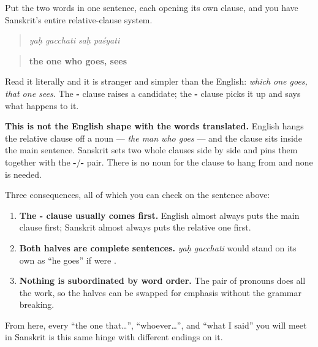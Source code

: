 \begin{grammarlens}[title={Grammar Lens: two clauses, one hinge}]
Put the two words in one sentence, each opening its own clause, and you have Sanskrit's entire relative-clause system.

\begin{quote}
\textbf{   }
\end{quote}

\begin{quote}
\emph{yaḥ gacchati saḥ paśyati}
\end{quote}

\begin{quote}
\textbf{the one who goes, sees}
\end{quote}

Read it literally and it is stranger and simpler than the English: \emph{which one goes, that one sees.} The \textbf{-} clause raises a candidate; the \textbf{-} clause picks it up and says what happens to it.

\textbf{This is not the English shape with the words translated.} English hangs the relative clause off a noun — \emph{the man who goes} — and the clause sits inside the main sentence. Sanskrit sets two whole clauses side by side and pins them together with the \textbf{-}/\textbf{-} pair. There is no noun for the clause to hang from and none is needed.

Three consequences, all of which you can check on the sentence above:

\begin{enumerate}
\raggedright
  \item \textbf{The - clause usually comes first.} English almost always puts the main clause first; Sanskrit almost always puts the relative one first.
  \item \textbf{Both halves are complete sentences.} \emph{yaḥ gacchati} would stand on its own as \textquotedblleft{}he goes\textquotedblright{} if \textbf{} were \textbf{}.
  \item \textbf{Nothing is subordinated by word order.} The pair of pronouns does all the work, so the halves can be swapped for emphasis without the grammar breaking.
\end{enumerate}

From here, every \textquotedblleft{}the one that…\textquotedblright{}, \textquotedblleft{}whoever…\textquotedblright{}, and \textquotedblleft{}what I said\textquotedblright{} you will meet in Sanskrit is this same hinge with different endings on it.
\end{grammarlens}

